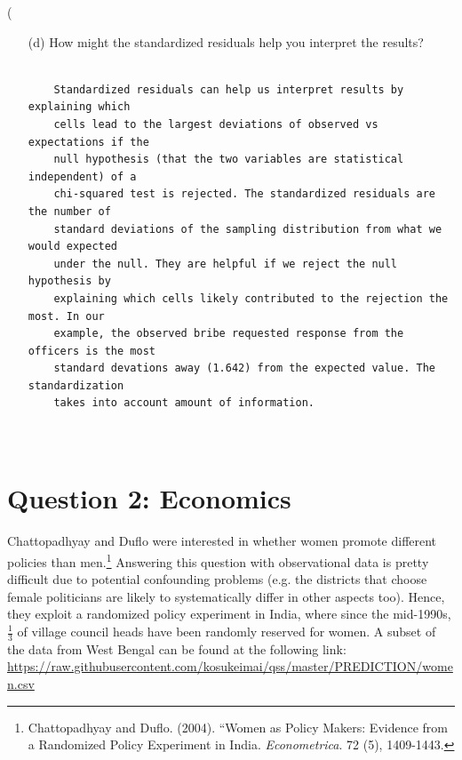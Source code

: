 \left( \documentclass[12pt,letterpaper]{article}
\begin{document}
\begin{enumerate}
	\vspace{3cm}
	\item [(d)] How might the standardized residuals help you interpret the results?  
	
\begin{verbatim}
		
	Standardized residuals can help us interpret results by explaining which 
	cells lead to the largest deviations of observed vs expectations if the 
	null hypothesis (that the two variables are statistical independent) of a
	chi-squared test is rejected. The standardized residuals are the number of
	standard deviations of the sampling distribution from what we would expected
	under the null. They are helpful if we reject the null hypothesis by 
	explaining which cells likely contributed to the rejection the most. In our
	example, the observed bribe requested response from the officers is the most
	standard devations away (1.642) from the expected value. The standardization
	takes into account amount of information.
	
	
\end{verbatim}
	
\end{enumerate}
\newpage

\section*{Question 2: Economics}
Chattopadhyay and Duflo were interested in whether women promote different policies than men.\footnote{Chattopadhyay and Duflo. (2004). ``Women as Policy Makers: Evidence from a Randomized Policy Experiment in India. \textit{Econometrica}. 72 (5), 1409-1443.} Answering this question with observational data is pretty difficult due to potential confounding problems (e.g. the districts that choose female politicians are likely to systematically differ in other aspects too). Hence, they exploit a randomized policy experiment in India, where since the mid-1990s, $\frac{1}{3}$ of village council heads have been randomly reserved for women. A subset of the data from West Bengal can be found at the following link: \url{https://raw.githubusercontent.com/kosukeimai/qss/master/PREDICTION/women.csv}\\
\end{document}
